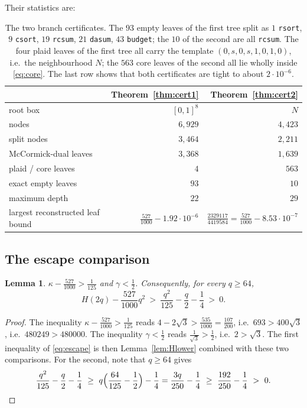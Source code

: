 \documentclass[11pt]{amsart}
\newtheorem{lemma}[theorem]{Lemma}
\theoremstyle{definition}
\theoremstyle{remark}
\begin{document}
Their statistics are:
\begin{table}[ht]
\centering
\begin{tabular}{@{}lrr@{}}
\toprule
 & Theorem~\ref{thm:cert1} & Theorem~\ref{thm:cert2}\\
\midrule
root box & $[0,1]^8$ & $N$\\
nodes & $6{,}929$ & $4{,}423$\\
split nodes & $3{,}464$ & $2{,}211$\\
McCormick-dual leaves & $3{,}368$ & $1{,}639$\\
plaid / core leaves & $4$ & $563$\\
exact empty leaves & $93$ & $10$\\
maximum depth & $22$ & $29$\\
largest reconstructed leaf bound & $\tfrac{527}{1000}-1.92\cdot10^{-6}$ & $\tfrac{2329117}{4419584}=\tfrac{527}{1000}-8.53\cdot10^{-7}$\\
\bottomrule
\end{tabular}
\medskip
\caption{The two branch certificates. The $93$ empty leaves of the first tree split as $1$ \texttt{rsort}, $9$ \texttt{csort}, $19$ \texttt{rcsum}, $21$ \texttt{dasum}, $43$ \texttt{budget}; the $10$ of the second are all \texttt{rcsum}. The four plaid leaves of the first tree all carry the template $(0,s,0,s,1,0,1,0)$, i.e.\ the neighbourhood $N$; the $563$ core leaves of the second all lie wholly inside \eqref{eq:core}. The last row shows that both certificates are tight to about $2\cdot10^{-6}$.}\label{tab:certs}
\end{table}

\subsection{The escape comparison}

\begin{lemma}\label{lem:escape}
$\kappa-\frac{527}{1000}>\frac1{125}$ and $\gamma<\frac12$. Consequently, for every $q\ge64$,
\begin{equation}\label{eq:escape}
H(2q)-\frac{527}{1000}q^2\ >\ \frac{q^2}{125}-\frac q2-\frac14\ >\ 0 .
\end{equation}
\end{lemma}

\begin{proof}
The inequality $\kappa-\frac{527}{1000}>\frac1{125}$ reads $4-2\sqrt3>\frac{535}{1000}=\frac{107}{200}$, i.e.\ $693>400\sqrt3$, i.e.\ $480249>480000$. The inequality $\gamma<\frac12$ reads $\frac1{\sqrt3}>\frac12$, i.e.\ $2>\sqrt3$. The first inequality of \eqref{eq:escape} is then Lemma~\ref{lem:Hlower} combined with these two comparisons. For the second, note that $q\ge64$ gives
\[
\frac{q^2}{125}-\frac q2-\frac14\ \ge\ q\Bigl(\frac{64}{125}-\frac12\Bigr)-\frac14=\frac{3q}{250}-\frac14\ \ge\ \frac{192}{250}-\frac14\ >\ 0 . \qedhere
\]
\end{proof}
\end{document}
